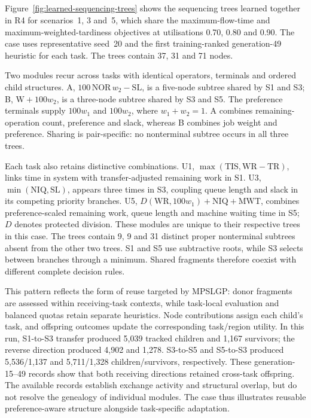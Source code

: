 \subsection{}
\label{sec:learned-tree-structures}
Figure~\ref{fig:learned-sequencing-trees} shows the sequencing trees learned together in R4 for scenarios~1, 3 and~5, which share the maximum-flow-time and maximum-weighted-tardiness objectives at utilisations 0.70, 0.80 and 0.90. The case uses representative seed~20 and the first training-ranked generation-49 heuristic for each task. The trees contain 37, 31 and 71 nodes.

Two modules recur across tasks with identical operators, terminals and ordered child structures. A, $100\,\mathrm{NOR}\,w_2-\mathrm{SL}$, is a five-node subtree shared by S1 and S3; B, $\mathrm{W}+100w_2$, is a three-node subtree shared by S3 and S5. The preference terminals supply $100w_1$ and $100w_2$, where $w_1+w_2=1$. A combines remaining-operation count, preference and slack, whereas B combines job weight and preference. Sharing is pair-specific: no nonterminal subtree occurs in all three trees.

Each task also retains distinctive combinations. U1, $\max(\mathrm{TIS},\mathrm{WR}-\mathrm{TR})$, links time in system with transfer-adjusted remaining work in S1. U3, $\min(\mathrm{NIQ},\mathrm{SL})$, appears three times in S3, coupling queue length and slack in its competing priority branches. U5, $D(\mathrm{WR},100w_1)+\mathrm{NIQ}+\mathrm{MWT}$, combines preference-scaled remaining work, queue length and machine waiting time in S5; $D$ denotes protected division. These modules are unique to their respective trees in this case. The trees contain 9, 9 and 31 distinct proper nonterminal subtrees absent from the other two trees. S1 and S5 use subtractive roots, while S3 selects between branches through a minimum. Shared fragments therefore coexist with different complete decision rules.

This pattern reflects the form of reuse targeted by MPSLGP: donor fragments are assessed within receiving-task contexts, while task-local evaluation and balanced quotas retain separate heuristics. Node contributions assign each child's task, and offspring outcomes update the corresponding task/region utility. In this run, S1-to-S3 transfer produced 5,039 tracked children and 1,167 survivors; the reverse direction produced 4,902 and 1,278. S3-to-S5 and S5-to-S3 produced 5,536/1,137 and 5,711/1,328 children/survivors, respectively. These generation-15--49 records show that both receiving directions retained cross-task offspring. The available records establish exchange activity and structural overlap, but do not resolve the genealogy of individual modules. The case thus illustrates reusable preference-aware structure alongside task-specific adaptation.

